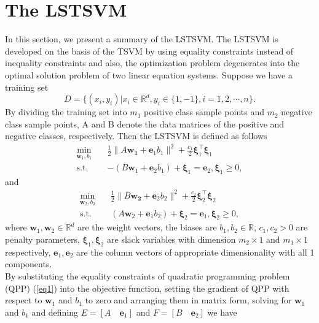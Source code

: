 \documentclass[twoside]{article}
\begin{document}
\section{The LSTSVM}\label{sec2}
In this section, we present a summary of the LSTSVM.
The LSTSVM is developed on the basis of the TSVM by using equality constraints instead of inequality constraints and also, the optimization problem degenerates into the optimal solution problem of two linear equation systems. Suppose we have a training set 
\[D=\{(x_i,y_i)| x_i\in \mathbb{R}^{d}, y_i\in\{1,-1\}, i=1,2,\cdots, n\}. \]
By dividing the training set into $m_1$ positive class sample points and $m_2$ negative class sample points, A and B denote the data matrices of the positive and negative classes, respectively. Then the LSTSVM is defined as follows
\begin{equation}\label{eq1}
\begin{aligned}
\min_{\mathbf{w}_1, b_1} \quad & \frac{1}{2} \|A\mathbf{w_1}+\textbf{e}_{1}b_{1}\|^2 + \frac{c_1}{2}\boldsymbol{\xi}_{1}^{\top}\boldsymbol{\xi}_{1}\\
\text{s.t.} \quad & -\left( B\mathbf{w}_1+\textbf{e}_{2}b_{1}\right)+\boldsymbol{\xi}_1=\textbf{e}_2, \boldsymbol{\xi}_1\geq 0,
\end{aligned}
\end{equation}
and
\begin{equation}\label{eq2}
\begin{aligned}
\min_{\mathbf{w}_2, b_2} \quad & \frac{1}{2} \|B\mathbf{w_2}+\textbf{e}_{2}b_{2}\|^2 + \frac{c_2}{2}\boldsymbol{\xi}_{2}^{\top}\boldsymbol{\xi}_{2}\\
\text{s.t.} \quad & \left(A\mathbf{w}_2+\textbf{e}_{1}b_{2}\right)+\boldsymbol{\xi}_2=\textbf{e}_1, \boldsymbol{\xi}_2\geq 0,
\end{aligned}
\end{equation}
where $\textbf{w}_1,\textbf{w}_2\in \mathbb{R}^{d}$ are the weight vectors, the biases are $b_1, b_2\in \mathbb{R}$, $c_1,c_2>0$ are penalty parameters, $\boldsymbol{\xi}_1, \boldsymbol{\xi}_2$ are slack variables with dimension $m_{2}\times 1$ and $m_{1}\times 1$ respectively, $\textbf{e}_1, \textbf{e}_2$ are the column vectors of appropriate dimensionality with all 1 components.
\\
By substituting the equality constraints of quadratic programming problem (QPP) (\ref{eq1}) into the objective function, setting the gradient of QPP with respect to $\textbf{w}_1$ and $b_1$ to zero and arranging them in matrix form, solving for $\textbf{w}_1$ and $b_1$ and defining $E=[A\quad \textbf{e}_1]$ and $F=[B\quad \textbf{e}_2]$ we have
\end{document}
